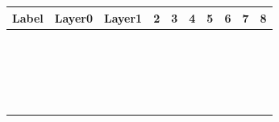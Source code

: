 \begin{center}
\begin{tabular}{|p{1.3cm}|p{1.3cm}|p{1.3cm}|p{1.3cm}|p{1.3cm}|p{1.3cm}|p{1.3cm}|p{1.3cm}|p{1.3cm}|p{1.3cm}|}
\hline
\textbf{Label} &
\textbf{Layer0} &
\textbf{Layer1} &
\textbf{2} &
\textbf{3} &
\textbf{4} &
\textbf{5} &
\textbf{6} &
\textbf{7} &
\textbf{8} \\
\hline
\hline
&  &   &   &    &  &   &   &    &    \\[0.8em]
\hline
&  &   &   &    &  &   &   &    &    \\[0.8em]
\hline
&  &   &   &    &  &   &   &    &    \\[0.8em]
\hline
&  &   &   &    &  &   &   &    &    \\[0.8em]
\hline
&  &   &   &    &  &   &   &    &    \\[0.8em]
\hline
&  &   &   &    &  &   &   &    &    \\[0.8em]
\hline
&  &   &   &    &  &   &   &    &    \\[0.8em]
\hline
&  &   &   &    &  &   &   &    &    \\[0.8em]
\hline
&  &   &   &    &  &   &   &    &    \\[0.8em]
\hline
&  &   &   &    &  &   &   &    &    \\[0.8em]
\hline
&  &   &   &    &  &   &   &    &    \\[0.8em]
\hline
&  &   &   &    &  &   &   &    &    \\[0.8em]
\hline
&  &   &   &    &  &   &   &    &    \\[0.8em]
\hline
&  &   &   &    &  &   &   &    &    \\[0.8em]
\hline
&  &   &   &    &  &   &   &    &    \\[0.8em]
\hline
&  &   &   &    &  &   &   &    &    \\[0.8em]
\hline
&  &   &   &    &  &   &   &    &    \\[0.8em]
\hline
&  &   &   &    &  &   &   &    &    \\[0.8em]
\hline
&  &   &   &    &  &   &   &    &    \\[0.8em]
\hline
&  &   &   &    &  &   &   &    &    \\[0.8em]
\hline
\end{tabular}
\end{center}

